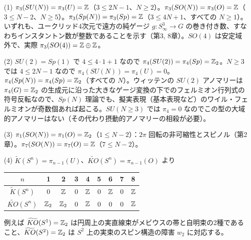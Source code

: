 \begin{solution}
(1) $\pi_3(SU(N))=\pi_3(U)=\mathbb{Z}$（$3\le2N-1$、$N\ge2$）。$\pi_3(SO(N))=\pi_3(O)=\mathbb{Z}$（$3\le N-2$、$N\ge5$）。$\pi_3(Sp(N))=\pi_3(Sp)=\mathbb{Z}$（$3\le4N+1$、すべての $N\ge1$）。いずれも、ユークリッド4次元で遠方の純ゲージ $g\colon S^3_\infty\to G$ の巻き付き数、すなわちインスタントン数が整数であることを示す（第3, 8章）。$SO(4)$ は安定域外で、実際 $\pi_3(SO(4))=\mathbb{Z}\oplus\mathbb{Z}$。

(2) $SU(2)=Sp(1)$ で $4\le4\cdot1+1$ なので $\pi_4(SU(2))=\pi_4(Sp)=\mathbb{Z}_2$。$N\ge3$ では $4\le2N-1$ なので $\pi_4(SU(N))=\pi_4(U)=0$。$\pi_4(Sp(N))=\pi_4(Sp)=\mathbb{Z}_2$（すべての $N$）。ウィッテンの $SU(2)$ アノマリーは $\pi_4(G)=\mathbb{Z}_2$ の生成元に沿った大きなゲージ変換の下でのフェルミオン行列式の符号反転なので、$Sp(N)$ 理論でも、擬実表現（基本表現など）のワイル・フェルミオンが奇数個あれば起こる。$SU(N\ge3)$ では $\pi_4=0$ なのでこの型の大域的アノマリーはない（その代わり摂動的アノマリーの相殺が必要）。

(3) $\pi_1(SO(N))=\pi_1(O)=\mathbb{Z}_2$（$1\le N-2$）：$2\pi$ 回転の非可縮性とスピノル（第2章）。$\pi_7(SO(N))=\pi_7(O)=\mathbb{Z}$（$7\le N-2$）。

(4) $\tilde K(S^n)=\pi_{n-1}(U)$、$\widetilde{KO}(S^n)=\pi_{n-1}(O)$ より
\begin{center}
\begin{tabular}{c|cccccccc}
$n$ & 1 & 2 & 3 & 4 & 5 & 6 & 7 & 8\\ \hline
$\tilde K(S^n)$ & 0 & $\mathbb{Z}$ & 0 & $\mathbb{Z}$ & 0 & $\mathbb{Z}$ & 0 & $\mathbb{Z}$\\
$\widetilde{KO}(S^n)$ & $\mathbb{Z}_2$ & $\mathbb{Z}_2$ & 0 & $\mathbb{Z}$ & 0 & 0 & 0 & $\mathbb{Z}$
\end{tabular}
\end{center}
例えば $\widetilde{KO}(S^1)=\mathbb{Z}_2$ は円周上の実直線束がメビウスの帯と自明束の2種であること、$\widetilde{KO}(S^2)=\mathbb{Z}_2$ は $S^2$ 上の実束のスピン構造の障害 $w_2$ に対応する。
\end{solution}


